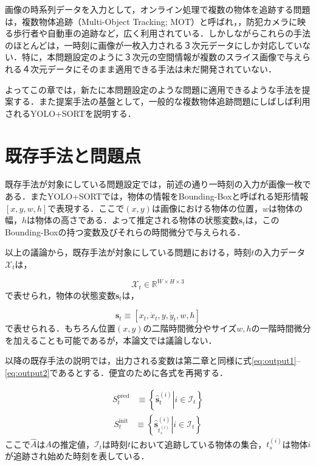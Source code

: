 \thispagestyle{fancy2}

画像の時系列データを入力として，オンライン処理で複数の物体を追跡する問題は，複数物体追跡（Multi-Object Tracking; MOT）と呼ばれ，\cite{luo2021multiple}，防犯カメラに映る歩行者や自動車の追跡など，広く利用されている．しかしながらこれらの手法のほとんどは，一時刻に画像が一枚入力される３次元データにしか対応していない．特に，本問題設定のように３次元の空間情報が複数のスライス画像で与えられる４次元データにそのまま適用できる手法は未だ開発されていない．
\par
よってこの章では，新たに本問題設定のような問題に適用できるような手法を提案する．また提案手法の基盤として，一般的な複数物体追跡問題にしばしば利用されるYOLO+SORT\cite{redmon2016you,alif2024yolov1,bewley2016simple}を説明する．

\section{既存手法と問題点}
既存手法が対象にしている問題設定では，前述の通り一時刻の入力が画像一枚である．またYOLO+SORTでは，物体の情報をBounding-Boxと呼ばれる矩形情報$\left[x, y, w, h\right]$で表現する．ここで$(x,y)$は画像における物体の位置，$w$は物体の幅，$h$は物体の高さである．よって推定される物体の状態変数$\bm{s}_t$は，このBounding-Boxの持つ変数及びそれらの時間微分で与えられる．
\par
以上の議論から，既存手法が対象にしている問題における，時刻$t$の入力データ$\mathcal{X}_t$は，

\begin{equation}
    \mathcal{X}_t \in \mathbb{R}^{W \times H \times 3}
\end{equation}
で表せられ，物体の状態変数$\bm{s}_t$は，

\begin{equation}
    \bm{s}_t \equiv \left[x_t, \dot{x}_t, y, \dot{y}_t, w, h\right]
\end{equation}
で表せられる．もちろん位置$(x,y)$の二階時間微分やサイズ$w,h$の一階時間微分を加えることも可能であるが，本論文では議論しない．
\par
以降の既存手法の説明では，出力される変数は第二章と同様に式\ref{eq:output1}--\ref{eq:output2}であるとする．便宜のために各式を再掲する．

\begin{equation}
    \label{eq:output1on3}
    \begin{aligned}
        S^{\text{pred}}_t &\equiv \left\{ \left. \hat{\bm{s}}_t^{(i)}\right| i \in \mathcal{I}_t\right\}
    \end{aligned}
\end{equation}
\begin{equation}
    \label{eq:output2on3}
    \begin{aligned}
        S^{\text{init}}_t &\equiv \left\{ \left. \hat{\bm{s}}_{t_s^{(i)}}^{(i)}\right| i \in \mathcal{I}_t\right\}
    \end{aligned}
\end{equation}
ここで$\hat{A}$は$A$の推定値，$\mathcal{I}_t$は時刻$t$において追跡している物体の集合，$t_s^{(i)}$は物体$i$が追跡され始めた時刻を表している．

